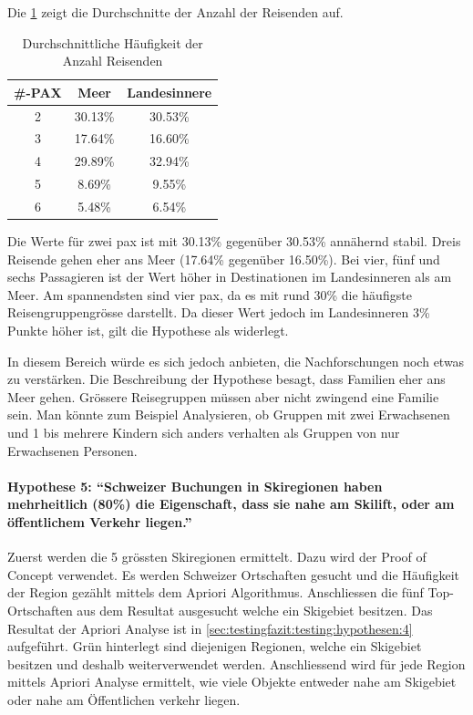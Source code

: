 Die \cref{sec:testingfazit:testing:hypothesen:3:2} zeigt die Durchschnitte der Anzahl der Reisenden auf.
\begin{table}[H] 
	\caption{Durchschnittliche Häufigkeit der Anzahl Reisenden}
	\centering
	\label{sec:testingfazit:testing:hypothesen:3:2}
	\begin{tabular}{ | c | c | c | } 
		\hline 
		\rowcolor{tableheadcolor}
		\bfseries \#-PAX & \bfseries Meer & \bfseries Landesinnere \\ \hline 		
		2 & 30.13\% & 30.53\% \\ \hline
		3 & 17.64\% & 16.60\% \\ \hline
		4 & 29.89\% & 32.94\% \\ \hline
		5 & 8.69\% & 9.55\% \\ \hline
		6 & 5.48\% & 6.54\% \\ \hline
	\end{tabular}
\end{table}

Die Werte für zwei \gls{pax} ist mit 30.13\% gegenüber 30.53\% annähernd stabil. Dreis Reisende gehen eher ans Meer (17.64\% gegenüber 16.50\%). Bei vier, fünf und sechs Passagieren ist der Wert höher in Destinationen im Landesinneren als am Meer. Am spannendsten sind vier \gls{pax}, da es mit rund 30\% die häufigste Reisengruppengrösse darstellt. Da dieser Wert jedoch im Landesinneren 3\% Punkte höher ist, gilt die Hypothese als widerlegt.

In diesem Bereich würde es sich jedoch anbieten, die Nachforschungen noch etwas zu verstärken. Die Beschreibung der Hypothese besagt, dass Familien eher ans Meer gehen. Grössere Reisegruppen müssen aber nicht zwingend eine Familie sein. Man könnte zum Beispiel Analysieren, ob Gruppen mit zwei Erwachsenen und 1 bis mehrere Kindern sich anders verhalten als Gruppen von nur Erwachsenen Personen.

\paragraph{Hypothese 5: "`Schweizer Buchungen in Skiregionen haben mehrheitlich (80\%) die Eigenschaft, dass sie nahe am Skilift, oder am öffentlichem Verkehr liegen."'} Zuerst werden die 5 grössten Skiregionen ermittelt. Dazu wird der Proof of Concept verwendet. Es werden Schweizer Ortschaften gesucht und die Häufigkeit der Region gezählt mittels dem Apriori Algorithmus. Anschliessen die fünf Top-Ortschaften aus dem Resultat ausgesucht welche ein Skigebiet besitzen. Das Resultat der Apriori Analyse ist in \cref{sec:testingfazit:testing:hypothesen:4} aufgeführt. \colorbox{green!25}{Grün} hinterlegt sind diejenigen Regionen, welche ein Skigebiet besitzen und deshalb weiterverwendet werden. Anschliessend wird für jede Region mittels Apriori Analyse ermittelt, wie viele Objekte entweder nahe am Skigebiet oder nahe am Öffentlichen verkehr liegen. 

